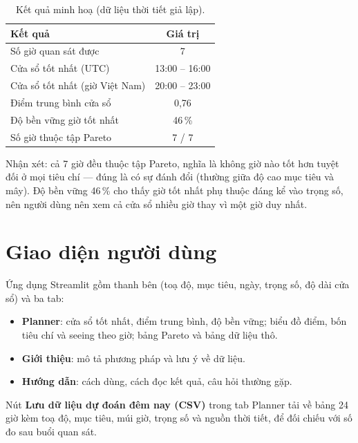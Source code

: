 \documentclass[12pt,a4paper]{article}
\begin{document}
\begin{table}[h]
\centering
\begin{tabular}{lc}
\toprule
\textbf{Kết quả} & \textbf{Giá trị} \\
\midrule
Số giờ quan sát được & 7 \\
Cửa sổ tốt nhất (UTC) & 13:00 -- 16:00 \\
Cửa sổ tốt nhất (giờ Việt Nam) & 20:00 -- 23:00 \\
Điểm trung bình cửa sổ & 0,76 \\
Độ bền vững giờ tốt nhất & 46\,\% \\
Số giờ thuộc tập Pareto & 7 / 7 \\
\bottomrule
\end{tabular}
\caption{Kết quả minh hoạ (dữ liệu thời tiết giả lập).}
\end{table}

Nhận xét: cả 7 giờ đều thuộc tập Pareto, nghĩa là không giờ nào tốt hơn tuyệt đối ở mọi tiêu
chí --- đúng là có sự đánh đổi (thường giữa độ cao mục tiêu và mây). Độ bền vững 46\,\% cho thấy
giờ tốt nhất phụ thuộc đáng kể vào trọng số, nên người dùng nên xem cả cửa sổ nhiều giờ thay vì
một giờ duy nhất.


\section{Giao diện người dùng}

Ứng dụng Streamlit gồm thanh bên (toạ độ, mục tiêu, ngày, trọng số, độ dài cửa sổ) và ba tab:
\begin{itemize}[nosep]
  \item \textbf{Planner}: cửa sổ tốt nhất, điểm trung bình, độ bền vững; biểu đồ điểm, bốn tiêu
        chí và seeing theo giờ; bảng Pareto và bảng dữ liệu thô.
  \item \textbf{Giới thiệu}: mô tả phương pháp và lưu ý về dữ liệu.
  \item \textbf{Hướng dẫn}: cách dùng, cách đọc kết quả, câu hỏi thường gặp.
\end{itemize}
Nút \textbf{Lưu dữ liệu dự đoán đêm nay (CSV)} trong tab Planner tải về bảng 24 giờ kèm toạ độ,
mục tiêu, múi giờ, trọng số và nguồn thời tiết, để đối chiếu với số đo sau buổi quan sát.
\end{document}
